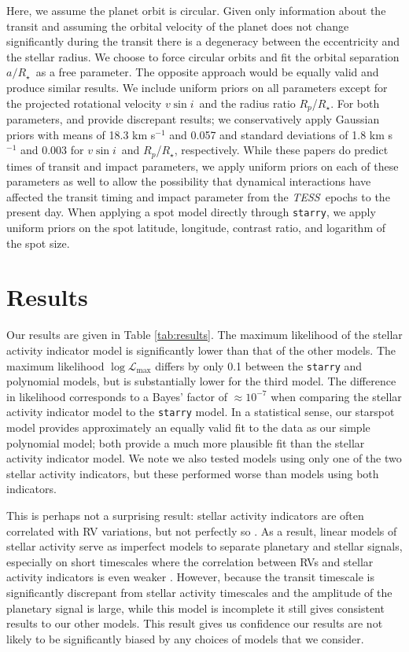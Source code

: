 \documentclass[twocolumn]{aastex63}
\newcommand{\tess}{{\it TESS}}
\newcommand{\vsini}{{$v \sin i$}}
\newcommand{\rstar}{{$R_\star$}}
\begin{document}
Here, we assume the planet orbit is circular. 
Given only information about the transit and assuming the orbital velocity of the planet does not change significantly during the transit there is a degeneracy between the eccentricity and the stellar radius. 
We choose to force circular orbits and fit the orbital separation $a/$\rstar\ as a free parameter. The opposite approach would be equally valid and produce similar results.
We include uniform priors on all parameters except for the projected rotational velocity \vsini\ and the radius ratio $R_p$/\rstar.
For both parameters, \citet{Benatti19} and \citet{Newton19} provide discrepant results; we conservatively apply Gaussian priors with means of 18.3 km s$^{-1}$ and 0.057 and standard deviations of 1.8 km s$^{-1}$ and 0.003 for \vsini\ and $R_p$/\rstar, respectively.
While these papers do predict times of transit and impact parameters, we apply uniform priors on each of these parameters as well to allow the possibility that dynamical interactions have affected the transit timing and impact parameter from the \tess\ epochs to the present day.
When applying a spot model directly through \texttt{starry}, we apply uniform priors on the spot latitude, longitude, contrast ratio, and logarithm of the spot size.


\section{Results}
\label{sec:results}

Our results are given in Table \ref{tab:results}. 
The maximum likelihood of the stellar activity indicator model is significantly lower than that of the other models. 
The maximum likelihood $\log \mathcal{L}_\textrm{max}$ differs by only 0.1 between the \texttt{starry} and polynomial models, but is substantially lower for the third model. 
The difference in likelihood corresponds to a Bayes' factor of $\approx 10^{-7}$ when comparing the stellar activity indicator model to the \texttt{starry} model.
In a statistical sense, our starspot model provides approximately an equally valid fit to the data as our simple polynomial model; both provide a much more plausible fit than the stellar activity indicator model.
We note we also tested models using only one of the two stellar activity indicators, but these performed worse than models using both indicators.

This is perhaps not a surprising result: stellar activity indicators are often correlated with RV variations, but not perfectly so \citep{gomesdasilva2011, robertson13}.
As a result, linear models of stellar activity serve as imperfect models to separate planetary and stellar signals, especially on short timescales where the correlation between RVs and stellar activity indicators is even weaker \citep{Meunier19}.
However, because the transit timescale is significantly discrepant from stellar activity timescales and the amplitude of the planetary signal is large, while this model is incomplete it still gives consistent results to our other models. 
This result gives us confidence our results are not likely to be significantly biased by any choices of models that we consider.
\end{document}
